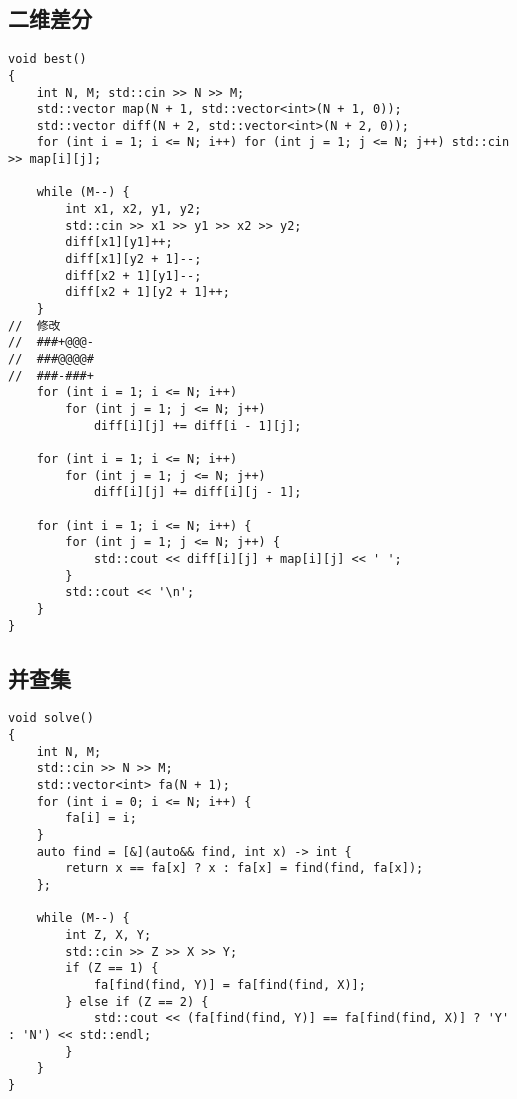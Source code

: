 \documentclass[a4paper, 10pt]{paper}
\begin{document}
        \subsection{二维差分}
        \begin{verbatim}
void best()
{
    int N, M; std::cin >> N >> M;
    std::vector map(N + 1, std::vector<int>(N + 1, 0));
    std::vector diff(N + 2, std::vector<int>(N + 2, 0));
    for (int i = 1; i <= N; i++) for (int j = 1; j <= N; j++) std::cin >> map[i][j];

    while (M--) {
        int x1, x2, y1, y2;
        std::cin >> x1 >> y1 >> x2 >> y2;
        diff[x1][y1]++;
        diff[x1][y2 + 1]--;
        diff[x2 + 1][y1]--;
        diff[x2 + 1][y2 + 1]++;
    }
//  修改
//  ###+@@@-
//  ###@@@@#
//  ###-###+
    for (int i = 1; i <= N; i++)
        for (int j = 1; j <= N; j++)
            diff[i][j] += diff[i - 1][j];

    for (int i = 1; i <= N; i++)
        for (int j = 1; j <= N; j++)
            diff[i][j] += diff[i][j - 1];

    for (int i = 1; i <= N; i++) {
        for (int j = 1; j <= N; j++) {
            std::cout << diff[i][j] + map[i][j] << ' ';
        }
        std::cout << '\n';
    }
}
        \end{verbatim}

        \subsection{并查集}
        \begin{verbatim}
void solve()
{
    int N, M;
    std::cin >> N >> M;
    std::vector<int> fa(N + 1);
    for (int i = 0; i <= N; i++) {
        fa[i] = i;
    }
    auto find = [&](auto&& find, int x) -> int {
        return x == fa[x] ? x : fa[x] = find(find, fa[x]);
    };

    while (M--) {
        int Z, X, Y;
        std::cin >> Z >> X >> Y;
        if (Z == 1) {
            fa[find(find, Y)] = fa[find(find, X)];
        } else if (Z == 2) {
            std::cout << (fa[find(find, Y)] == fa[find(find, X)] ? 'Y' : 'N') << std::endl;
        }
    }
}
        \end{verbatim}
\end{document}
